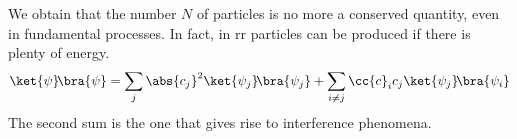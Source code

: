 We obtain that the number $N$ of particles is no more a conserved
quantity, even in fundamental processes.
In fact, in \ac{rr} particles can be produced if there is plenty of energy.
\begin{equation}
	\ket{\psi}\!\bra{\psi} = \sum_{j} \abs{c_j}^2\ket{\psi_j}\!\bra{\psi_j} + 
	\sum_{i\neq j}\cc{c}_i c_j\ket{\psi_j}\!\bra{\psi_i}
\end{equation}
The second sum is the one that gives rise to interference phenomena.
